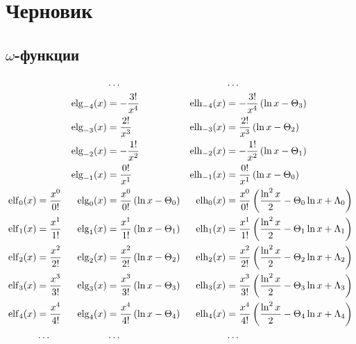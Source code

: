 
\chapter{Черновик}

\section{$\omega$-функции}

\begin{equation*} \begin{aligned}
&&
&\ldots &
&\ldots \\
%
&&
\elg_{-4}(x) &=
- \frac{3!}{x^4} &
\elh_{-4}(x) &=
- \frac{3!}{x^4} \left(
  \ln{x} - \Theta_3 \right) \\
%
&&
\elg_{-3}(x) &=
  \frac{2!}{x^3} &
\elh_{-3}(x) &=
  \frac{2!}{x^3} \left(
  \ln{x} - \Theta_2 \right) \\
%
&& 
\elg_{-2}(x) &=
- \frac{1!}{x^2} &
\elh_{-2}(x) &=
- \frac{1!}{x^2} \left(
  \ln{x} - \Theta_1 \right) \\
%
&& 
\elg_{-1}(x) &=
  \frac{0!}{x^1} &
\elh_{-1}(x) &=
  \frac{0!}{x^1} \left(
  \ln{x} - \Theta_0 \right) \\
%
\elf_0(x) &=
  \frac{x^0}{0!} &
\elg_0(x) &= 
  \frac{x^0}{0!} \left(
  \ln{x} - \Theta_0 \right) &
\elh_0(x) &=
  \frac{x^0}{0!} \left(
  \frac{\ln^2{x}}{2}
- \Theta_0 \ln{x}
+ \Lambda_0 \right) \\
%
\elf_1(x) &=
  \frac{x^1}{1!} &
\elg_1(x) &= 
  \frac{x^1}{1!} \left(
  \ln{x} - \Theta_1 \right) &
\elh_1(x) &=
  \frac{x^1}{1!} \left(
  \frac{\ln^2{x}}{2}
- \Theta_1 \ln{x}
+ \Lambda_1 \right) \\
%
\elf_2(x) &=
  \frac{x^2}{2!} &
\elg_2(x) &= 
  \frac{x^2}{2!} \left(
  \ln{x} - \Theta_2 \right) &
\elh_2(x) &=
  \frac{x^2}{2!} \left(
  \frac{\ln^2{x}}{2}
- \Theta_2 \ln{x}
+ \Lambda_2 \right) \\
%
\elf_3(x) &=
  \frac{x^3}{3!} &
\elg_3(x) &= 
  \frac{x^3}{3!} \left(
  \ln{x} - \Theta_3 \right) &
\elh_3(x) &=
  \frac{x^3}{3!} \left(
  \frac{\ln^2{x}}{2}
- \Theta_3 \ln{x}
+ \Lambda_3 \right) \\
%
\elf_4(x) &=
  \frac{x^4}{4!} &
\elg_4(x) &= 
  \frac{x^4}{4!} \left(
  \ln{x} - \Theta_4 \right) &
\elh_4(x) &=
  \frac{x^4}{4!} \left(
  \frac{\ln^2{x}}{2}
- \Theta_4 \ln{x}
+ \Lambda_4 \right) \\
%
&\ldots &
&\ldots &
&\ldots \\
\end{aligned} \end{equation*}
